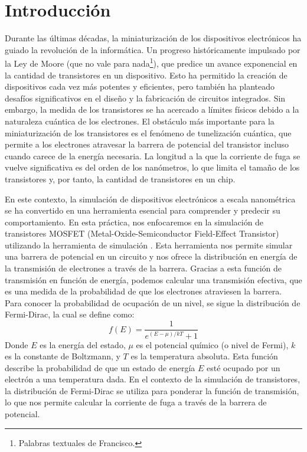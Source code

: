 
\section{Introducción}
Durante las últimas décadas, la miniaturización de los dispositivos electrónicos ha guiado la revolución de la informática. 
Un progreso históricamente impulsado por la Ley de Moore (que no vale para nada\footnote{Palabras textuales de Francisco.}), que predice un avance exponencial en la cantidad de transistores 
en un dispositivo. Esto ha permitido la creación de dispositivos cada vez más potentes y eficientes, pero también ha planteado desafíos significativos en el diseño y la fabricación de circuitos integrados.
Sin embargo, la medida de los transistores se ha acercado a límites físicos debido a la naturaleza cuántica de los electrones.
El obstáculo más importante para la miniaturización de los transistores es el fenómeno de tunelización cuántica, que permite a los electrones atravesar la barrera de potencial
del transistor incluso cuando carece de la energía necesaria. La longitud a la que la corriente de fuga se vuelve significativa es del orden de los nanómetros, lo que limita
el tamaño de los transistores y, por tanto, la cantidad de transistores en un chip.

En este contexto, la simulación de dispositivos electrónicos a escala nanométrica se ha convertido en una herramienta esencial para comprender y predecir su comportamiento.
En esta práctica, nos enfocaremos en la simulación de transistores MOSFET (Metal-Oxide-Semiconductor Field-Effect Transistor) utilizando 
la herramienta de simulación \cite{nanohub_pcpbt}. Esta herramienta nos permite simular una barrera de potencial en un circuito y nos ofrece la 
distribución en energía de la transmisión de electrones a través de la barrera. Gracias a esta función de transmisión en función de energía, podemos 
calcular una transmisión efectiva, que es una medida de la probabilidad de que los electrones atraviesen la barrera. \\

Para conocer la probabilidad de ocupación de un nivel, se sigue la distribución de Fermi-Dirac, la cual se define como:
\begin{equation}
    \label{eq:fermi_dirac}
    f(E) = \frac{1}{e^{(E - \mu)/kT} + 1}
\end{equation}
Donde $E$ es la energía del estado, $\mu$ es el potencial químico (o nivel de Fermi), $k$ es la constante de Boltzmann, y $T$ es la temperatura absoluta. Esta función describe la probabilidad de que un estado de energía $E$ esté ocupado por un electrón a una temperatura dada. En el contexto de la simulación de transistores, la distribución de Fermi-Dirac se utiliza para ponderar la función de transmisión, lo que nos permite calcular la corriente de fuga a través de la barrera de potencial.

